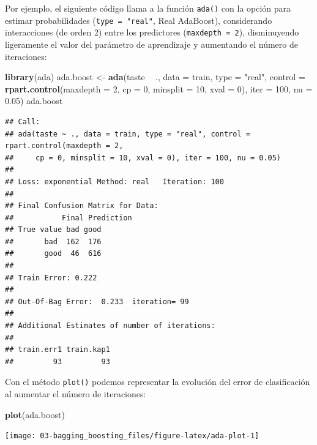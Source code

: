 \documentclass[
  spanish,
]{book}
\newenvironment{Shaded}{\begin{snugshade}}{\end{snugshade}}
\newcommand{\DataTypeTok}[1]{\textcolor[rgb]{0.13,0.29,0.53}{#1}}
\newcommand{\DecValTok}[1]{\textcolor[rgb]{0.00,0.00,0.81}{#1}}
\newcommand{\FloatTok}[1]{\textcolor[rgb]{0.00,0.00,0.81}{#1}}
\newcommand{\KeywordTok}[1]{\textcolor[rgb]{0.13,0.29,0.53}{\textbf{#1}}}
\newcommand{\NormalTok}[1]{#1}
\newcommand{\OperatorTok}[1]{\textcolor[rgb]{0.81,0.36,0.00}{\textbf{#1}}}
\newcommand{\StringTok}[1]{\textcolor[rgb]{0.31,0.60,0.02}{#1}}
\theoremstyle{break}
\theoremstyle{definition}
\theoremstyle{definition}
\theoremstyle{definition}
\theoremstyle{remark}
\begin{document}
Por ejemplo, el siguiente código llama a la función \texttt{ada()} con la opción para estimar probabilidades (\texttt{type\ =\ "real"}, Real AdaBoost), considerando interacciones (de orden 2) entre los predictores (\texttt{maxdepth\ =\ 2}), disminuyendo ligeramente el valor del parámetro de aprendizaje y aumentando el número de iteraciones:

\begin{Shaded}
\begin{Highlighting}[]
\KeywordTok{library}\NormalTok{(ada)}
\NormalTok{ada.boost <-}\StringTok{ }\KeywordTok{ada}\NormalTok{(taste }\OperatorTok{~}\StringTok{ }\NormalTok{., }\DataTypeTok{data =}\NormalTok{ train, }\DataTypeTok{type =} \StringTok{"real"}\NormalTok{,}
             \DataTypeTok{control =} \KeywordTok{rpart.control}\NormalTok{(}\DataTypeTok{maxdepth =} \DecValTok{2}\NormalTok{, }\DataTypeTok{cp =} \DecValTok{0}\NormalTok{, }\DataTypeTok{minsplit =} \DecValTok{10}\NormalTok{, }\DataTypeTok{xval =} \DecValTok{0}\NormalTok{),}
             \DataTypeTok{iter =} \DecValTok{100}\NormalTok{, }\DataTypeTok{nu =} \FloatTok{0.05}\NormalTok{)}
\NormalTok{ada.boost}
\end{Highlighting}
\end{Shaded}

\begin{verbatim}
## Call:
## ada(taste ~ ., data = train, type = "real", control = rpart.control(maxdepth = 2, 
##     cp = 0, minsplit = 10, xval = 0), iter = 100, nu = 0.05)
## 
## Loss: exponential Method: real   Iteration: 100 
## 
## Final Confusion Matrix for Data:
##           Final Prediction
## True value bad good
##       bad  162  176
##       good  46  616
## 
## Train Error: 0.222 
## 
## Out-Of-Bag Error:  0.233  iteration= 99 
## 
## Additional Estimates of number of iterations:
## 
## train.err1 train.kap1 
##         93         93
\end{verbatim}

Con el método \texttt{plot()} podemos representar la evolución del error de clasificación al aumentar el número de iteraciones:

\begin{Shaded}
\begin{Highlighting}[]
\KeywordTok{plot}\NormalTok{(ada.boost)}
\end{Highlighting}
\end{Shaded}

\begin{center}\texttt{[image: 03-bagging\_boosting\_files/figure-latex/ada-plot-1]} \end{center}
\end{document}
